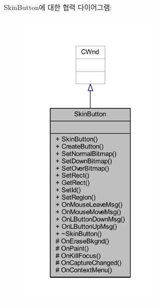Skin\+Button에 대한 협력 다이어그램\+:\nopagebreak
\begin{figure}[H]
\begin{center}
\leavevmode
\includegraphics[width=201pt]{class_skin_button__coll__graph}
\end{center}
\end{figure}
